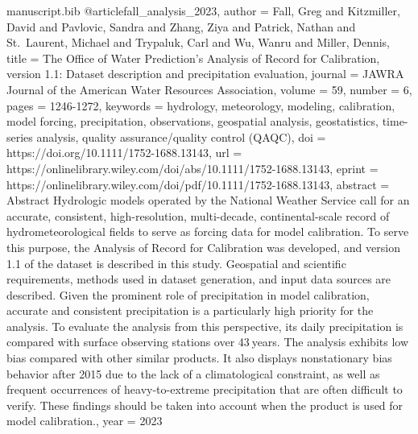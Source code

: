 \begin{filecontents*}[force]{manuscript.bib}
@article{fall_analysis_2023,
author = {Fall, Greg and Kitzmiller, David and Pavlovic, Sandra and Zhang, Ziya and Patrick, Nathan and St. Laurent, Michael and Trypaluk, Carl and Wu, Wanru and Miller, Dennis},
title = {The Office of Water Prediction's Analysis of Record for Calibration, version 1.1: Dataset description and precipitation evaluation},
journal = {JAWRA Journal of the American Water Resources Association},
volume = {59},
number = {6},
pages = {1246-1272},
keywords = {hydrology, meteorology, modeling, calibration, model forcing, precipitation, observations, geospatial analysis, geostatistics, time-series analysis, quality assurance/quality control (QAQC)},
doi = {https://doi.org/10.1111/1752-1688.13143},
url = {https://onlinelibrary.wiley.com/doi/abs/10.1111/1752-1688.13143},
eprint = {https://onlinelibrary.wiley.com/doi/pdf/10.1111/1752-1688.13143},
abstract = {Abstract Hydrologic models operated by the National Weather Service call for an accurate, consistent, high-resolution, multi-decade, continental-scale record of hydrometeorological fields to serve as forcing data for model calibration. To serve this purpose, the Analysis of Record for Calibration was developed, and version 1.1 of the dataset is described in this study. Geospatial and scientific requirements, methods used in dataset generation, and input data sources are described. Given the prominent role of precipitation in model calibration, accurate and consistent precipitation is a particularly high priority for the analysis. To evaluate the analysis from this perspective, its daily precipitation is compared with surface observing stations over 43 years. The analysis exhibits low bias compared with other similar products. It also displays nonstationary bias behavior after 2015 due to the lack of a climatological constraint, as well as frequent occurrences of heavy-to-extreme precipitation that are often difficult to verify. These findings should be taken into account when the product is used for model calibration.},
year = {2023}
}


\end{filecontents*}
